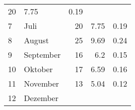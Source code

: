 \begin{longtable}{lXrrr}
       \num{20} &
       \num[round-mode=places,round-precision=2]{7.75} &
         \num[round-mode=places,round-precision=2]{0.19} \\

     7 &
     \multicolumn{1}{X}{ Juli   } &


       \num{20} &
       \num[round-mode=places,round-precision=2]{7.75} &
         \num[round-mode=places,round-precision=2]{0.19} \\

     8 &
     \multicolumn{1}{X}{ August   } &


       \num{25} &
       \num[round-mode=places,round-precision=2]{9.69} &
         \num[round-mode=places,round-precision=2]{0.24} \\

     9 &
     \multicolumn{1}{X}{ September   } &


       \num{16} &
       \num[round-mode=places,round-precision=2]{6.2} &
         \num[round-mode=places,round-precision=2]{0.15} \\

     10 &
     \multicolumn{1}{X}{ Oktober   } &


       \num{17} &
       \num[round-mode=places,round-precision=2]{6.59} &
         \num[round-mode=places,round-precision=2]{0.16} \\

     11 &
     \multicolumn{1}{X}{ November   } &


       \num{13} &
       \num[round-mode=places,round-precision=2]{5.04} &
         \num[round-mode=places,round-precision=2]{0.12} \\

     12 &
     \multicolumn{1}{X}{ Dezember   } &



\end{longtable}
